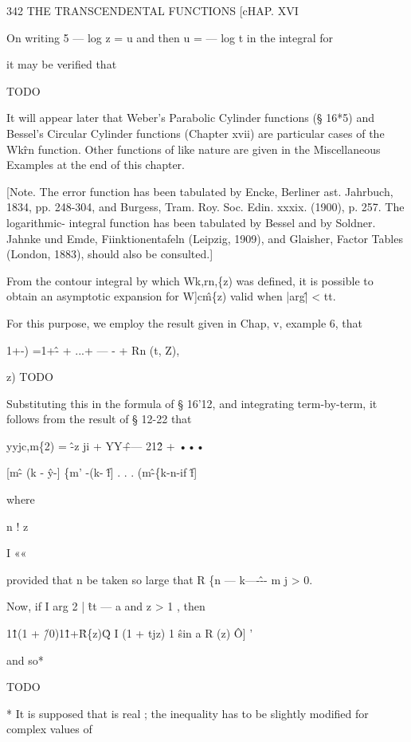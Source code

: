 342 THE TRANSCENDENTAL FUNCTIONS [cHAP. XVI

On writing 5 — log z = u and then u = — log t in the integral for

it may be verified that

TODO

It will appear later that Weber's Parabolic Cylinder functions (§
16*5) and Bessel's Circular Cylinder functions (Chapter xvii) are
particular cases of the Wk\^rn function. Other functions of like
nature are given in the Miscellaneous Examples at the end of this
chapter.

[Note. The error function has been tabulated by Encke, Berliner ast.
Jahrbuch, 1834, pp. 248-304, and Burgess, Tram. Roy. Soc. Edin. xxxix.
(1900), p. 257. The logarithmic- integral function has been tabulated
by Bessel and by Soldner. Jahnke und Emde, Fiinktionentafeln (Leipzig,
1909), and Glaisher, Factor Tables (London, 1883), should also be
consulted.]

From the contour integral by which Wk,rn,\{z) was defined, it is
possible to obtain an asymptotic expansion for W]c\^m\{z) valid when
|arg\^| < tt.

For this purpose, we employ the result given in Chap, v, example 6,
that

1+-) =1+\^- + ...+ — - + Rn (t, Z),

z) TODO

Substituting this in the formula of § 16'12, and integrating
term-by-term, it follows from the result of § 12-22 that

yyjc,m\{2) = \^ -z ji + YY\^ +— 21\^2 + •••

[m\^ - (k - \^y-] \{m' -(k- \^f] . . . (m\^ -\{k-n-if \^f]



where



n ! z



I ««



provided that n be taken so large that R \{n — k—-\^-- m j > 0.

Now, if I arg 2 | \^ tt — a and z > 1 , then

1\^1(1 + \^/0)1\^1+\^ R\{z)\^Q I (1 + tjz) 1 \^ sin a R (z) \^ O] '

and so*

TODO

* It is supposed that is real ; the inequality has to be slightly
modified for complex values of

